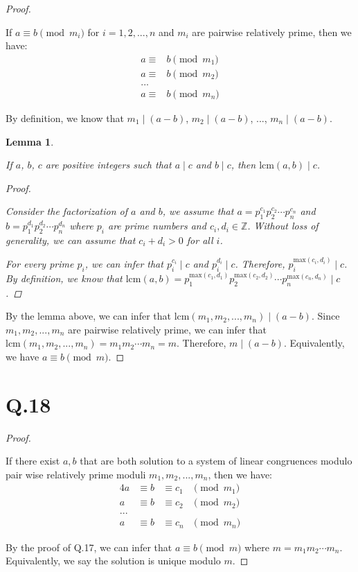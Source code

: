\documentclass[a4paper,12pt]{article}
\newtheorem{lemma}{Lemma}
\begin{document}
\begin{proof}
$ $

If $a \equiv b \pmod{m_i}$ for $i = 1,2,...,n$ and $m_i$ are pairwise relatively prime, then we have:
\begin{align*}
	a \equiv& b \pmod{m_1} \\
	a \equiv& b \pmod{m_2} \\
	... \\
	a \equiv& b \pmod{m_n}
\end{align*} 

By definition, we know that $m_1 \mid (a - b)$, $m_2 \mid (a - b)$, ..., $m_n \mid (a - b)$.

	\begin{lemma}
	$ $

	If $a$, $b$, $c$ are positive integers such that $a \mid c$ and $b \mid c$, then $\text{lcm}(a,b) \mid c$.

		\begin{proof}
		$ $

		Consider the factorization of $a$ and $b$, we assume that $a = p_1^{c_1} p_2^{c_2} \cdots p_n^{c_n}$ and $b = p_1^{d_1} p_2^{d_2} \cdots p_n^{d_n}$ where $p_i$ are prime numbers and $c_i, d_i \in \mathbb{Z}$.
		Without loss of generality, we can assume that $c_i + d_i > 0$ for all $i$.

		For every prime $p_i$, we can infer that $p_i^{c_i} \mid c$ and $p_i^{d_i} \mid c$.
		Therefore, $p_i^{\text{max}(c_i,d_i)} \mid c$.
		By definition, we know that $\text{lcm}(a,b) = p_1^{\text{max}(c_1,d_1)} p_2^{\text{max}(c_2,d_2)} \cdots p_n^{\text{max}(c_n,d_n)} \mid c$.
		\end{proof}
	\end{lemma}

By the lemma above, we can infer that $\text{lcm}(m_1,m_2,...,m_n) \mid (a - b)$.
Since $m_1, m_2, ..., m_n$ are pairwise relatively prime, we can infer that $\text{lcm}(m_1,m_2,...,m_n) = m_1 m_2 \cdots m_n = m$.
Therefore, $m \mid (a - b)$.
Equivalently, we have $a \equiv b \pmod{m}$.
\end{proof}

\section*{Q.18}

\begin{proof}
$ $

If there exist $a,b$ that are both solution to a system of linear congruences modulo pair wise relatively prime moduli $m_1,m_2,...,m_n$, then we have:
\begin{alignat*}{4}
	a &\equiv b &\equiv c_1 &\pmod{m_1} \\
	a &\equiv b &\equiv c_2 &\pmod{m_2} \\
	... \\
	a &\equiv b &\equiv c_n &\pmod{m_n}
\end{alignat*}

By the proof of Q.17, we can infer that $a \equiv b \pmod{m}$ where $m = m_1 m_2 \cdots m_n$.
Equivalently, we say the solution is unique modulo $m$.
\end{proof}
\end{document}
